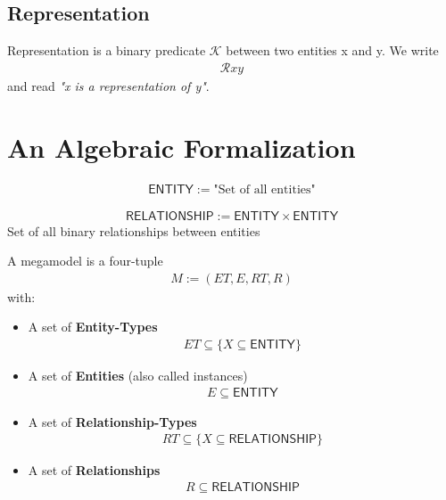 \documentclass[runningheads,a4paper]{llncs}
\newcommand{\ENTITY}{\mathsf{ENTITY}}
\newcommand{\RELATIONSHIP}{\mathsf{RELATIONSHIP}}
\begin{document}
\subsection{Representation}


\begin{definition}[Representation]
Representation is a binary predicate $\mathcal{K}$ between two entities x and y. We write
\begin{align}
\mathcal{R} x y
\end{align}
and read \textit{"x is a representation of y"}.
\end{definition}

\newpage

\section{An Algebraic Formalization}

\begin{definition}[Entities]
\begin{align}
\ENTITY := \text{"Set of all entities"}
\end{align}
\end{definition}

\begin{definition}[Relationships]
\begin{align}
\RELATIONSHIP := \ENTITY \times \ENTITY
\end{align}
Set of all binary relationships between entities
\end{definition}

\begin{definition}[Megamodel]
A megamodel is a four-tuple
\begin{align}
M := (ET, E, RT, R)
\end{align}
with:
\begin{itemize}

\item A set of \textbf{Entity-Types}
\begin{align}
ET \subseteq \{ X \subseteq \ENTITY \}
\end{align}

\item A set of \textbf{Entities} (also called instances)
\begin{align}
E \subseteq \ENTITY
\end{align}

\item A set of \textbf{Relationship-Types}
\begin{align}
RT \subseteq \{ X \subseteq \RELATIONSHIP \}
\end{align}

\item A set of \textbf{Relationships}
\begin{align}
R \subseteq \RELATIONSHIP
\end{align}

\end{itemize}
\end{definition}
\end{document}
